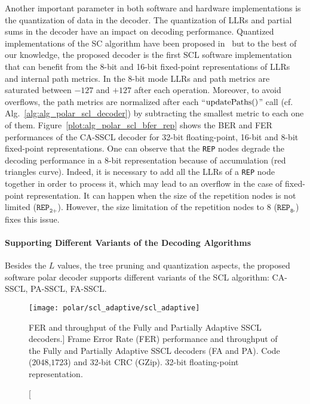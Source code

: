 Another important parameter in both software and hardware implementations is the
quantization of data in the decoder. The quantization of LLRs and partial sums
in the decoder have an impact on decoding performance. Quantized implementations
of the SC algorithm have been proposed in~\cite{Giard2016} but to the best of
our knowledge, the proposed decoder is the first SCL software implementation
that can benefit from the 8-bit and 16-bit fixed-point representations of LLRs
and internal path metrics. In the 8-bit mode LLRs and path metrics are saturated
between $-127$ and $+127$ after each operation. Moreover, to avoid overflows,
the path metrics are normalized after each ``$\operatorname*{updatePaths}()$'' call (cf.
Alg.~\ref{alg:alg_polar_scl_decoder}) by subtracting the smallest metric to each
one of them. Figure~\ref{plot:alg_polar_scl_bfer_rep} shows the BER and FER
performances of the CA-SSCL decoder for 32-bit floating-point, 16-bit and 8-bit
fixed-point representations. One can observe that the \verb|REP| nodes degrade
the decoding performance in a 8-bit representation because of accumulation (red
triangles curve). Indeed, it is necessary to add all the LLRs of a \verb|REP|
node together in order to process it, which may lead to an overflow in the case
of fixed-point representation. It can happen when the size of the repetition
nodes is not limited ($\texttt{REP}_\texttt{2+}$). However, the size limitation
of the repetition nodes to 8 ($\texttt{REP}_\texttt{8-}$) fixes this issue.

\paragraph{Supporting Different Variants of the Decoding Algorithms}

Besides the $L$ values, the tree pruning and quantization aspects, the proposed
software polar decoder supports different variants of the SCL algorithm:
CA-SSCL, PA-SSCL, FA-SSCL.

\begin{figure}[htp]
  \centering
  \texttt{[image: polar/scl\_adaptive/scl\_adaptive]}
  \caption
    [FER and throughput of the Fully and Partially Adaptive SSCL decoders.]
    {Frame Error Rate (FER) performance and throughput of the Fully and
    Partially Adaptive SSCL decoders (FA and PA). Code ($2048$,$1723$) and
    32-bit CRC (GZip). 32-bit floating-point representation.}
  \label{plot:alg_polar_scl_adaptive}
\end{figure}


